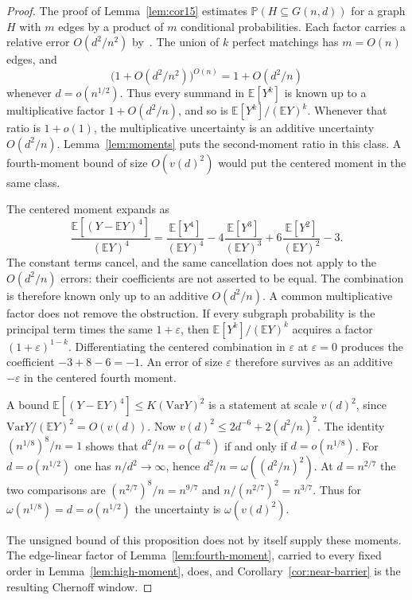 \documentclass[11pt]{article}
\newcommand{\Gnd}{G(n,d)}
\newcommand{\EE}{\mathbb{E}}
\newcommand{\PP}{\mathbb{P}}
\newcommand{\Var}{\mathrm{Var}}
\begin{document}
\begin{proof}
The proof of Lemma~\ref{lem:cor15} estimates \(\PP(H\subseteq\Gnd)\) for a graph \(H\)
with \(m\) edges by a product of \(m\) conditional probabilities.
Each factor carries a relative error \(O(d^2/n^2)\) by~\cite[Theorem~6]{Gao20}.
The union of \(k\) perfect matchings has \(m=O(n)\) edges, and
\[
\bigl(1+O(d^2/n^2)\bigr)^{O(n)}=1+O(d^2/n)
\]
whenever \(d=o(n^{1/2})\).
Thus every summand in \(\EE[Y^k]\) is known up to a multiplicative factor \(1+O(d^2/n)\),
and so is \(\EE[Y^k]/(\EE Y)^k\).
Whenever that ratio is \(1+o(1)\), the multiplicative uncertainty is an additive
uncertainty \(O(d^2/n)\).
Lemma~\ref{lem:moments} puts the second-moment ratio in this class.
A fourth-moment bound of size \(O(v(d)^2)\) would put the centered moment in the
same class.

The centered moment expands as
\[
\frac{\EE[(Y-\EE Y)^4]}{(\EE Y)^4}
=
\frac{\EE[Y^4]}{(\EE Y)^4}
-4\frac{\EE[Y^3]}{(\EE Y)^3}
+6\frac{\EE[Y^2]}{(\EE Y)^2}
-3.
\]
The constant terms cancel, and the same cancellation does not apply to the
\(O(d^2/n)\) errors: their coefficients are not asserted to be equal.
The combination is therefore known only up to an additive \(O(d^2/n)\).
A common multiplicative factor does not remove the obstruction.
If every subgraph probability is the principal term times the same \(1+\varepsilon\),
then \(\EE[Y^k]/(\EE Y)^k\) acquires a factor \((1+\varepsilon)^{1-k}\).
Differentiating the centered combination in \(\varepsilon\) at \(\varepsilon=0\) produces
the coefficient \(-3+8-6=-1\).
An error of size \(\varepsilon\) therefore survives as an additive \(-\varepsilon\) in the
centered fourth moment.

A bound \(\EE[(Y-\EE Y)^4]\le K(\Var Y)^2\) is a statement at scale \(v(d)^2\), since
\(\Var Y/(\EE Y)^2=O(v(d))\).
Now \(v(d)^2\le 2d^{-6}+2(d^2/n)^2\).
The identity \((n^{1/8})^8/n=1\) shows that \(d^2/n=o(d^{-6})\) if and only if
\(d=o(n^{1/8})\).
For \(d=o(n^{1/2})\) one has \(n/d^2\to\infty\), hence
\(d^2/n=\omega((d^2/n)^2)\).
At \(d=n^{2/7}\) the two comparisons are
\((n^{2/7})^8/n=n^{9/7}\) and \(n/(n^{2/7})^2=n^{3/7}\).
Thus for \(\omega(n^{1/8})=d=o(n^{1/2})\) the uncertainty is \(\omega(v(d)^2)\).

The unsigned bound of this proposition does not by itself supply these moments.
The edge-linear factor of Lemma~\ref{lem:fourth-moment}, carried to every fixed
order in Lemma~\ref{lem:high-moment}, does, and Corollary~\ref{cor:near-barrier}
is the resulting Chernoff window.
\end{proof}
\end{document}
